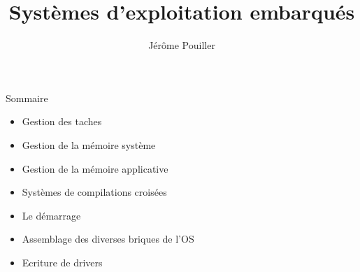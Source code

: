 \documentclass[10pt,ucs,usepdftitle=false]{beamer}
\title{Systèmes d'exploitation embarqués}
\author[Sysmic - J. Pouiller]{Jérôme Pouiller \email{j.pouiller@sysmic.org}}
\institute[Sysmic]{}
\date{}
\begin{document}
  \begin{frame}[plain]
    \maketitle
  \end{frame}


  \begin{frame}{Sommaire}
    \begin{itemize} 
      \item Gestion des taches %
      \item Gestion de la mémoire système %
      \item Gestion de la mémoire applicative %
      \item Systèmes de compilations croisées %
      \item Le démarrage %
      \item Assemblage des diverses briques de l'OS %
      \item Ecriture de drivers %
    \end{itemize} 
  \end{frame}





%

%



%
%
%
\end{document}
